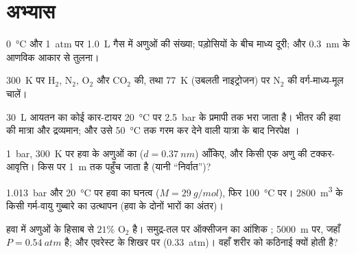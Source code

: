 \section{अभ्यास}

\begin{exercise}[$\star$]\label{exo:b1:kinetic-theory:1}
\qty{0}{\degreeCelsius} और \qty{1}{atm} पर \qty{1.0}{L} गैस में अणुओं की
संख्या; पड़ोसियों के बीच माध्य दूरी; और \qty{0.3}{nm} के आणविक आकार से
तुलना।
\end{exercise}

\begin{exercise}[$\star$]\label{exo:b1:kinetic-theory:2}
\qty{300}{K} पर H$_2$, N$_2$, O$_2$ और CO$_2$ की, तथा \qty{77}{K}
(उबलती नाइट्रोजन) पर N$_2$ की वर्ग-माध्य-मूल चालें।
\end{exercise}

\begin{exercise}[$\star$]\label{exo:b1:kinetic-theory:3}
\qty{30}{L} आयतन का कोई कार-टायर \qty{20}{\degreeCelsius} पर
\qty{2.5}{bar} के प्रमापी  तक भरा जाता है। भीतर की हवा की मात्रा और
द्रव्यमान; और उसे \qty{50}{\degreeCelsius} तक गरम कर देने वाली यात्रा के
बाद निरपेक्ष ।
\end{exercise}

\begin{exercise}[$\star$]\label{exo:b1:kinetic-theory:4}
\qty{1}{bar}, \qty{300}{K} पर हवा के अणुओं का 
($d = \qty{0.37}{nm}$) आँकिए, और किसी एक अणु की टक्कर-आवृत्ति। किस  पर
 \qty{1}{m} तक पहुँच जाता है (यानी ``निर्वात'')?
\end{exercise}

\begin{exercise}[$\star\star$]\label{exo:b1:kinetic-theory:5}
\qty{1.013}{bar} और \qty{20}{\degreeCelsius} पर हवा का घनत्व
($M = \qty{29}{g/mol}$), फिर \qty{100}{\degreeCelsius} पर। \qty{2800}{m^3}
के किसी गर्म-वायु गुब्बारे का उत्थापन (हवा के दोनों भारों का अंतर)।
\end{exercise}

\begin{exercise}[$\star\star$]\label{exo:b1:kinetic-theory:6}
हवा में अणुओं के हिसाब से $21\%$ O$_2$ है। समुद्र-तल पर ऑक्सीजन का आंशिक
; \qty{5000}{m} पर, जहाँ $P = \qty{0.54}{atm}$ है; और एवरेस्ट के शिखर
पर (\qty{0.33}{atm})। वहाँ शरीर को कठिनाई क्यों होती है?
\end{exercise}

